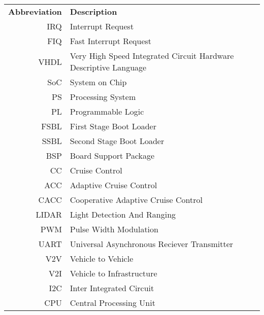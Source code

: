 \begin{tabular}{r l}
\textbf{Abbreviation} 	& \textbf{Description} \vspace{.5em} \\
IRQ		&Interrupt Request\\
FIQ		&Fast Interrupt Request\\
VHDL	&Very High Speed Integrated Circuit Hardware Descriptive Language\\
SoC		&System on Chip\\
PS		&Processing System\\
PL		&Programmable Logic\\
FSBL	&First Stage Boot Loader\\
SSBL	&Second Stage Boot Loader\\
BSP		&Board Support Package\\
CC		&Cruise Control\\
ACC		&Adaptive Cruise Control\\
CACC	&Cooperative Adaptive Cruise Control\\
LIDAR	&Light Detection And Ranging\\
PWM		&Pulse Width Modulation\\
UART	&Universal Asynchronous Reciever Transmitter\\
V2V		&Vehicle to Vehicle\\
V2I		&Vehicle to Infrastructure\\
I2C		&Inter Integrated Circuit\\
CPU		&Central Processing Unit\\

\end{tabular}